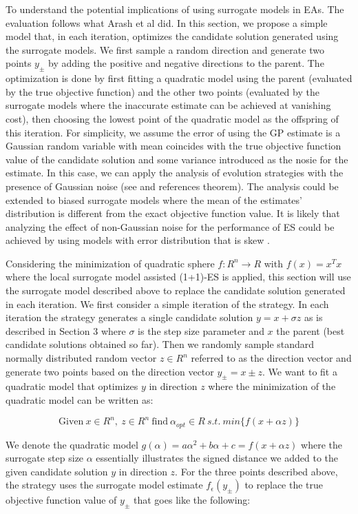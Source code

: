 To understand the potential implications of using surrogate models in EAs. The evaluation follows what Arash et al \cite{ARASH} did. In this section, we propose a simple model that, in each iteration, optimizes the candidate solution generated using the surrogate models. We first sample a random direction and generate two points $y_\pm$ by adding the positive and negative directions to the parent. The optimization is done by first fitting a quadratic model using the parent (evaluated by the true objective function) and the other two points (evaluated by the surrogate models where the inaccurate estimate can be achieved at vanishing cost), then choosing the lowest point of the quadratic model as the offspring of this iteration. For simplicity, we assume the error of using the GP estimate is a Gaussian random variable with mean coincides with the true objective function value of the candidate solution and some variance introduced as the nosie for the estimate. In this case, we can apply the analysis of evolution strategies with the presence of Gaussian noise (see \cite{Arnold02noisyoptimization} and references theorem). The analysis could be extended to biased surrogate models where the mean of the estimates' distribution is different from the exact objective function value. It is likely that analyzing the effect of non-Gaussian noise for the performance of ES could be achieved by using models with error distribution that is skew \cite{1665028}. 


Considering the minimization of quadratic sphere $f: R^n \rightarrow R$ with $f(x)=x^Tx$ where the local surrogate model assisted (1+1)-ES is applied, this section will use the surrogate model described above to replace the candidate solution generated in each iteration. We first consider a simple iteration of the strategy. In each iteration the strategy generates a single candidate solution $y=x+\sigma z$ as is described in Section 3 where $\sigma$ is the step size parameter and $x$ the parent (best candidate solutions obtained so far).  Then we randomly sample standard normally distributed random vector $z \in R^n$ referred to as the direction vector and generate two points based on the direction vector $y_\pm = x\pm z$. We want to fit a quadratic model that optimizes $y$ in direction $z$ where the minimization of the quadratic model can be written as:

$$\text{Given}\ x \in R^n,\ z \in R^n\ \text{find}\ \alpha_{opt} \in R\ s.t.\ min \{f(x+\alpha z) \}$$

We denote the quadratic model $g(\alpha) = a\alpha^2 + b \alpha + c = f(x+\alpha z)$ where the surrogate step size $\alpha$ essentially illustrates the signed distance we added to the given candidate solution $y$ in direction $z$. For the three points described above, the strategy uses the surrogate model estimate $f_{\epsilon}(y_{\pm})$ to replace the true objective function value of $y_\pm$ that goes like the following:

